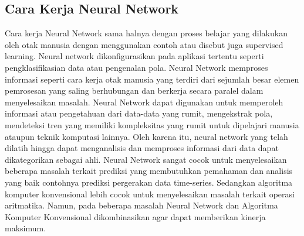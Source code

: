 \subsection{Cara Kerja Neural Network}
Cara kerja Neural Network sama halnya dengan proses belajar yang dilakukan oleh otak manusia dengan menggunakan contoh atau disebut juga supervised learning. Neural network dikonfigurasikan pada aplikasi tertentu seperti pengklasifikasian data atau pengenalan pola. Neural Network memproses informasi seperti cara kerja otak manusia yang terdiri dari sejumlah besar elemen pemrosesan yang saling berhubungan dan berkerja secara paralel dalam menyelesaikan masalah. Neural Network dapat digunakan untuk memperoleh informasi atau pengetahuan dari data-data yang rumit, mengekstrak pola, mendeteksi tren yang memiliki kompleksitas yang rumit untuk dipelajari manusia ataupun teknik komputasi lainnya. Oleh karena itu, neural network yang telah dilatih hingga dapat menganalisis dan memproses informasi dari data dapat dikategorikan sebagai ahli. Neural Network sangat cocok untuk menyelesaikan beberapa masalah terkait prediksi yang membutuhkan pemahaman dan analisis yang baik contohnya prediksi pergerakan data time-series. Sedangkan algoritma komputer konvensional lebih cocok untuk menyelesaikan masalah terkait operasi aritmatika. Namun, pada beberapa masalah Neural Network dan Algoritma Komputer Konvensional dikombinasikan agar dapat memberikan kinerja maksimum.